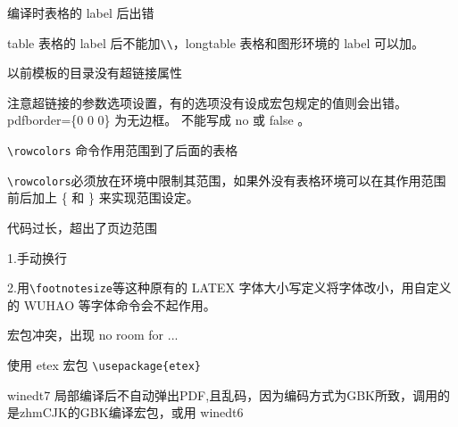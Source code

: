 \begin{list}
\item
\color{red}
编译时表格的 label 后出错\\
\normalcolor

table 表格的 label 后不能加\verb|\\|，longtable 表格和图形环境的
label 可以加。

\item
\color{red}
以前模板的目录没有超链接属性\\
\normalcolor

注意超链接的参数选项设置，有的选项没有设成宏包规定的值则会出错。 pdfborder=\{0 0 0\} 为无边框。 不能写成 no 或 false 。



\item
\color{red}
\verb|\rowcolors| 命令作用范围到了后面的表格\\
\normalcolor

\verb|\rowcolors|必须放在环境中限制其范围，如果外没有表格环境可以在其作用范围前后加上 \{ 和 \} 来实现范围设定。


\item
\color{red}
代码过长，超出了页边范围\\
\normalcolor

1.手动换行

2.用\verb|\footnotesize|等这种原有的 LATEX 字体大小写定义将字体改小，用自定义的 WUHAO 等字体命令会不起作用。


\item
\color{red}
宏包冲突，出现 no room for ... \\
\normalcolor

 使用 etex 宏包 \verb|\usepackage{etex}|


\item
\color{red}
winedt7 局部编译后不自动弹出PDF,且乱码，因为编码方式为GBK所致，调用的是zhmCJK的GBK编译宏包，或用 winedt6\\
\normalcolor


\end{list}
